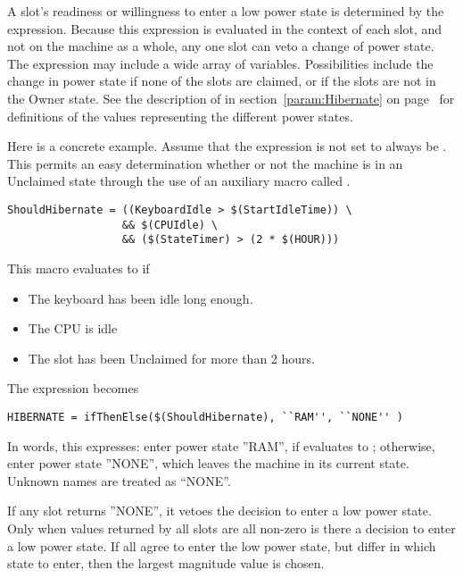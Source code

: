 A slot's readiness or willingness to enter a low power state is 
determined by the  expression. 
Because this expression is evaluated in the context of each slot,
and not on the machine as a whole, 
any one slot can veto a change of power state.  
The  expression may include a wide array of variables.
Possibilities include the change in power state if 
none of the slots are claimed, or if the slots are not in the
Owner state.
See the description of  in
section~\ref{param:Hibernate} on page~\pageref{param:Hibernate}
for definitions of the values representing the different
power states.

Here is a concrete example.
Assume that the  expression is not set to
always be .
This permits an easy determination whether or not
the machine is in an Unclaimed state through the use of
an auxiliary macro called .

\begin{verbatim}
ShouldHibernate = ((KeyboardIdle > $(StartIdleTime)) \
                  && $(CPUIdle) \
                  && ($(StateTimer) > (2 * $(HOUR)))
\end{verbatim}

This macro evaluates to  if
\begin{itemize}
\item The keyboard has been idle long enough.
\item The CPU is idle
\item The slot has been Unclaimed for more than 2 hours.
\end{itemize}

The  expression becomes

\begin{verbatim}
HIBERNATE = ifThenElse($(ShouldHibernate), ``RAM'', ``NONE'' )
\end{verbatim}

In words, this expresses:
enter power state ''RAM'',
if  evaluates to ; 
otherwise, enter power state ''NONE'',
which leaves the machine in its current state.   Unknown names are
treated as ``NONE''.

If any slot returns ''NONE'',
it vetoes the decision to enter a low power state.
Only when values returned by all slots are all non-zero 
is there a decision to enter a low power state.
If all agree to enter the low power state, but differ in which state to enter,
then the largest magnitude value is chosen. 


